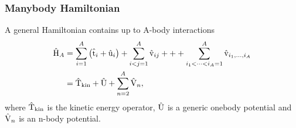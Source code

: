 \begin{frame}[fragile]
    \frametitle{Manybody Hamiltonian}

    A general Hamiltonian contains up to A-body interactions
    \begin{align*}
        \hat{\mathrm{H}}_A &= \sum_{i=1}^A \left(\hat{\mathrm{t}}_i + \hat{\mathrm{u}}_i\right) 
            + \sum_{i < j = 1}^A \hat{\mathrm{v}}_{ij}
            +++ 
            \sum_{i_1 < \dots < i_A =1}^A \hat{\mathrm{v}}_{i_1,\dots, i_A} \\
            &= \hat{\mathrm{T}}_{\mathrm{kin}} + \hat{\mathrm{U}} + \sum_{n = 2}^A \hat{\mathrm{V}}_n,
    \end{align*}
    where $\hat{\mathrm{T}}_{\mathrm{kin}}$ is the kinetic energy operator, $\hat{\mathrm{U}}$ is a generic onebody potential and $\hat{\mathrm{V}}_n$ is an n-body potential.
\end{frame}
